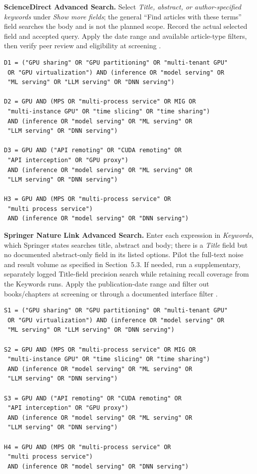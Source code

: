 \noindent\textbf{ScienceDirect Advanced Search.} Select \emph{Title, abstract, or author-specified keywords} under \emph{Show more fields}; the general ``Find articles with these terms'' field searches the body and is not the planned scope. Record the actual selected field and accepted query. Apply the date range and available article-type filters, then verify peer review and eligibility at screening \cite{elsevierSearch}.
\begin{Verbatim}[fontsize=\footnotesize,breaklines=true]
D1 = ("GPU sharing" OR "GPU partitioning" OR "multi-tenant GPU"
 OR "GPU virtualization") AND (inference OR "model serving" OR
 "ML serving" OR "LLM serving" OR "DNN serving")

D2 = GPU AND (MPS OR "multi-process service" OR MIG OR
 "multi-instance GPU" OR "time slicing" OR "time sharing")
 AND (inference OR "model serving" OR "ML serving" OR
 "LLM serving" OR "DNN serving")

D3 = GPU AND ("API remoting" OR "CUDA remoting" OR
 "API interception" OR "GPU proxy")
 AND (inference OR "model serving" OR "ML serving" OR
 "LLM serving" OR "DNN serving")

H3 = GPU AND (MPS OR "multi-process service" OR
 "multi process service")
 AND (inference OR "model serving" OR "DNN serving")
\end{Verbatim}

\noindent\textbf{Springer Nature Link Advanced Search.} Enter each expression in \emph{Keywords}, which Springer states searches title, abstract and body; there is a \emph{Title} field but no documented abstract-only field in its listed options. Pilot the full-text noise and result volume as specified in Section~5.3. If needed, run a supplementary, separately logged Title-field precision search while retaining recall coverage from the Keywords runs. Apply the publication-date range and filter out books/chapters at screening or through a documented interface filter \cite{springerSearch}.
\begin{Verbatim}[fontsize=\footnotesize,breaklines=true]
S1 = ("GPU sharing" OR "GPU partitioning" OR "multi-tenant GPU"
 OR "GPU virtualization") AND (inference OR "model serving" OR
 "ML serving" OR "LLM serving" OR "DNN serving")

S2 = GPU AND (MPS OR "multi-process service" OR MIG OR
 "multi-instance GPU" OR "time slicing" OR "time sharing")
 AND (inference OR "model serving" OR "ML serving" OR
 "LLM serving" OR "DNN serving")

S3 = GPU AND ("API remoting" OR "CUDA remoting" OR
 "API interception" OR "GPU proxy")
 AND (inference OR "model serving" OR "ML serving" OR
 "LLM serving" OR "DNN serving")

H4 = GPU AND (MPS OR "multi-process service" OR
 "multi process service")
 AND (inference OR "model serving" OR "DNN serving")
\end{Verbatim}


